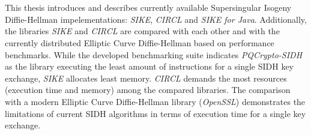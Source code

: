 \chapter{\abstractname}

This thesis introduces and describes currently available Supersingular Isogeny Diffie-Hellman impelementations: \textit{SIKE}, \textit{CIRCL} and \textit{SIKE for Java}. Additionally, the libraries \textit{SIKE} and \textit{CIRCL} are compared with each other and with the currently distributed Elliptic Curve Diffie-Hellman based on performance benchmarks.  While the developed benchmarking suite indicates \textit{PQCrypto-SIDH} as the library executing the least amount of instructions for a single SIDH key exchange, \textit{SIKE} allocates least memory. \textit{CIRCL} demands the most resources (execution time and memory) among the compared libraries. The comparison with a modern Elliptic Curve Diffie-Hellman library (\textit{OpenSSL}) demonstrates the limitations of current SIDH algorithms in terms of execution time for a single key exchange.



